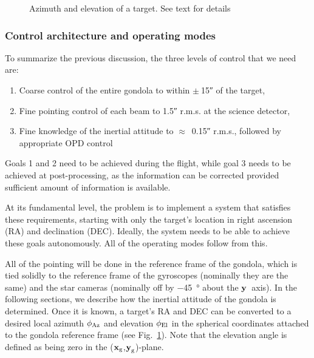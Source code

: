\begin{figure}[!h]
	\centering
	
	\caption[Azimuth and elevation of a target]{Azimuth and elevation of a target. See text for details}
	\label{fig:AzEl}
    \end{figure}



\subsubsection{Control architecture and operating modes}
\label{subsec:ControlArchitecture}

To summarize the previous discussion, the three levels of control that we need are:
\begin{enumerate}
\item Coarse control of the entire gondola to within $\pm~$\ang{;;15} of the target,
\item Fine pointing control of each beam to \ang{;;1.5} r.m.s. at the science detector,
\item Fine knowledge of the inertial attitude to $\approx$~\ang{;;0.15} r.m.s., followed by appropriate OPD control
\end{enumerate}

Goals 1 and 2 need to be achieved during the flight, while goal 3 needs to be achieved at post-processing, as the \OPD information can be corrected provided sufficient amount of information is available.

At its fundamental level, the problem is to implement a system that satisfies these requirements, starting with only the target's location in right ascension (RA) and declination (DEC). Ideally, the system needs to be able to achieve these goals autonomously. All of the operating modes follow from this.

All of the pointing will be done in the reference frame of the gondola, which is tied solidly to the reference frame of the gyroscopes (nominally they are the same) and the star cameras (nominally off by \SI{-45}{\degree} about the $\textrm{\textbf{y}}$~axis). In the following sections, we describe how the inertial attitude of the gondola is determined. Once it is known, a target's RA and DEC can be converted to a desired local azimuth $\phi_\textrm{Az}$ and elevation $\phi_\textrm{El}$ in the spherical coordinates attached to the gondola reference frame (see Fig.~\ref{fig:AzEl}). Note that the elevation angle is defined as being zero in the ($\textrm{\textbf{x}}_{\textrm{g}}$,$\textrm{\textbf{y}}_{\textrm{g}}$)-plane.



